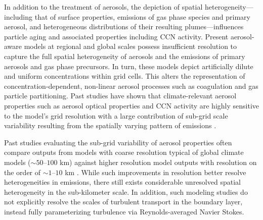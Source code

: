 \documentclass[journal abbreviation, manuscript]{copernicus}
\begin{document}
In addition to the treatment of aerosols, the depiction of spatial heterogeneity---including that of surface properties, emissions of gas phase species and primary aerosol, and heterogeneous distributions of their resulting plumes---influences particle aging and associated properties including CCN activity. Present aerosol-aware models at regional and global scales possess insufficient resolution to capture the full spatial heterogeneity of aerosols and the emissions of primary aerosols and gas phase precursors. In turn, these models depict artificially dilute and uniform concentrations within grid cells. This alters the representation of concentration-dependent, non-linear aerosol processes such as coagulation and gas particle partitioning. Past studies have shown that climate-relevant aerosol properties such as aerosol optical properties \citep{gustafson_jr_downscaling_2011} and CCN activity \citep{weigum_effect_2016} are highly sensitive to the model’s grid resolution with a large contribution of sub-grid scale variability resulting from the spatially varying pattern of emissions \citep{qian_investigation_2010}. 


Past studies evaluating the sub-grid variability of aerosol properties often compare outputs from models with coarse resolution typical of global climate models ($\sim 50$--$100$ km) against higher resolution model outputs with resolution on the order of $\sim 1$--$10$ km 
\citep{qian_investigation_2010, gustafson_jr_downscaling_2011, weigum_effect_2016, crippa_impact_2017, lin_quantification_2017}. While such improvements in resolution better resolve heterogeneities in emissions, there still exists considerable unresolved spatial heterogeneity in the sub-kilometer scale. In addition, such modeling studies do not explicitly resolve the scales of turbulent transport in the boundary layer, instead fully parameterizing turbulence via Reynolds-averaged Navier Stokes. 

\end{document}

